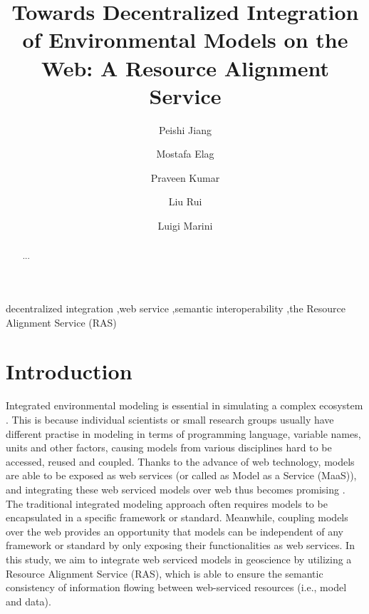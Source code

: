 \documentclass[review]{elsarticle}
\begin{document}
\begin{frontmatter}

\title{Towards Decentralized Integration of Environmental Models on the Web: A Resource Alignment Service}

\author[address1]{Peishi Jiang}
\author[address1]{Mostafa Elag}
\author[address1]{Praveen Kumar}
\author[address2]{Liu Rui}
\author[address2]{Luigi Marini}

\address[address1]{Ven Te Chow, Hydrosystem Laboratory, Civil and Environmental Engineering, University of Illinois, Urbana, IL, USA}
\address[address2]{National Center for Supercomputing Applications, University of Illinois, Urbana, IL, USA}

\begin{abstract}
...
\end{abstract}

\begin{keyword}
decentralized integration \sep web service \sep semantic interoperability \sep the Resource Alignment Service (RAS) 
\end{keyword}

\end{frontmatter}

\linenumbers

\section{Introduction}Integrated environmental modeling is essential in simulating a complex ecosystem \citep{argent2004}. This is because individual scientists or small research groups usually have different practise in modeling in terms of programming language, variable names, units and other factors, causing models from various disciplines hard to be accessed, reused and coupled. Thanks to the advance of web technology, models are able to be exposed as web services (or called as Model as a Service (MaaS)), and integrating these web serviced models over web thus becomes promising \citep{goodall2011}. The traditional integrated modeling approach often requires models to be encapsulated in a specific framework or standard. Meanwhile, coupling models over the web provides an opportunity that models can be independent of any framework or standard by only exposing their functionalities as web services. In this study, we aim to integrate web serviced models in geoscience by utilizing a Resource Alignment Service (RAS), which is able to ensure the semantic consistency of information flowing between web-serviced resources (i.e., model and data).
\end{document}
